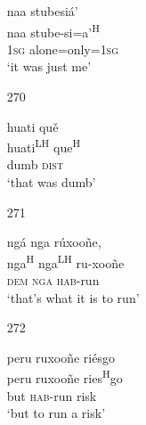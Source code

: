 \begin{itemize}
\glll   naa stubesi\'{a}' \\
naa stube-si=a'\textsuperscript{H} \\
\textsc{1sg} alone=only=\textsc{1sg}\\
\glt `it was just me'
 


\item[270]
 
\glll   huati qu\v{e} \\
 huati\textsuperscript{LH} que\textsuperscript{H}\\
dumb \textsc{dist}\\
\glt `that was dumb'
 


\item[271]
 
\glll   ng\'{a} nga r\'{u}xoo\~{n}e, \\
 nga\textsuperscript{H} nga\textsuperscript{LH} ru-xoo\~{n}e\\
 \textsc{dem} \textsc{nga} \textsc{hab}-run\\
\glt `that's what it is to run'
 


\item[272]
 
\glll   peru  ruxoo\~{n}e ri\'{e}sgo\\
peru  ruxoo\~{n}e ries\textsuperscript{H}go\\
but \textsc{hab}-run risk\\
\glt `but to run a risk'
 



\end{itemize}



